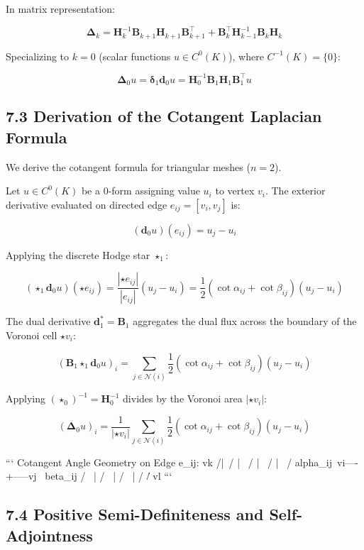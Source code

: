 \documentclass[11pt,twoside,openright]{amsbook}
\begin{document}
In matrix representation:

$$\boldsymbol{\Delta}_k = \mathbf{H}_k^{-1} \mathbf{B}_{k+1} \mathbf{H}_{k+1} \mathbf{B}_{k+1}^\top + \mathbf{B}_k^\top \mathbf{H}_{k-1}^{-1} \mathbf{B}_k \mathbf{H}_k$$

Specializing to $k = 0$ (scalar functions $u \in C^0(K)$), where $C^{-1}(K) = \{0\}$:

$$\boldsymbol{\Delta}_0 u = \boldsymbol{\delta}_1 \mathbf{d}_0 u = \mathbf{H}_0^{-1} \mathbf{B}_1 \mathbf{H}_1 \mathbf{B}_1^\top u$$

\subsection{7.3 Derivation of the Cotangent Laplacian Formula}

We derive the cotangent formula for triangular meshes ($n = 2$).

Let $u \in C^0(K)$ be a 0-form assigning value $u_i$ to vertex $v_i$.  
The exterior derivative evaluated on directed edge $e_{ij} = [v_i, v_j]$ is:

$$(\mathbf{d}_0 u)(e_{ij}) = u_j - u_i$$

Applying the discrete Hodge star $\star_1$:

$$(\star_1 \mathbf{d}_0 u)(\star e_{ij}) = \frac{|\star e_{ij}|}{|e_{ij}|} (u_j - u_i) = \frac{1}{2}(\cot \alpha_{ij} + \cot \beta_{ij})(u_j - u_i)$$

The dual derivative $\mathbf{d}_1^* = \mathbf{B}_1$ aggregates the dual flux across the boundary of the Voronoi cell $\star v_i$:

$$(\mathbf{B}_1 \star_1 \mathbf{d}_0 u)_i = \sum_{j \in \mathcal{N}(i)} \frac{1}{2}(\cot \alpha_{ij} + \cot \beta_{ij})(u_j - u_i)$$

Applying $(\star_0)^{-1} = \mathbf{H}_0^{-1}$ divides by the Voronoi area $|\star v_i|$:

$$(\boldsymbol{\Delta}_0 u)_i = \frac{1}{|\star v_i|} \sum_{j \in \mathcal{N}(i)} \frac{1}{2}(\cot \alpha_{ij} + \cot \beta_{ij})(u_j - u_i)$$

```
Cotangent Angle Geometry on Edge e_ij:
               vk
              /|\
             / | \
            /  |  \
           /   |   \
          / alpha_ij\
         vi----+-----vj
          \ beta_ij /
           \   |   /
            \  |  /
             \ | /
              \|/
               vl
```

\subsection{7.4 Positive Semi-Definiteness and Self-Adjointness}
\end{document}

